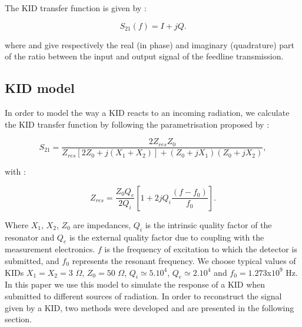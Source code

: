 The KID transfer function is given by :

\begin{equation}
S_{21}(f) = I +jQ .
\end{equation}

where \I  and \Q  give respectively the real (in phase) and imaginary (quadrature) part of the ratio between the input and output signal of the feedline transmission. \\

\subsection{KID model}

In order to model the way a KID reacts to an incoming radiation, we calculate the KID transfer function by following the
parametrisation proposed by \citet{2008ApPhL..93m4102G} :

\begin{equation}
S_{21} = \frac{2Z_{res}Z_{0}}{Z_{res}[2Z_{0} + j(X_{1}+X_{2})] + (Z_{0} +jX_{1})(Z_{0} +jX_{2})},
\end{equation}

with :

\begin{equation}
Z_{res} = \frac{Z_{0}Q_{e}}{2Q_{i}}[1 + 2jQ_{i}\frac{(f-f_{0})}{f_{0}}].
\end{equation}

Where $X_{1}$, $X_{2}$, $Z_{0}$ are impedances, $Q_{i}$ is the intrinsic quality factor of the resonator and $Q_{e}$ is the external quality factor due to coupling with the measurement electronics. $f$ is the frequency of excitation to which the detector is submitted, and $f_{0}$ represents the resonant frequency.  We choose typical values of KIDs $X_{1} = X_{2} = 3 $ $\Omega $, $Z_{0} = 50$ $\Omega$, $Q_{i} \simeq 5.10^{4}$, $Q_{e} \simeq 2.10^{4}$ and $f_{0} = 1.273$x$10^{9}$ Hz.\\

In this paper we use this model to simulate the response of a KID when submitted to different sources of radiation. In order to reconstruct the signal given by a KID, two methods were developed and are presented in the following section.
